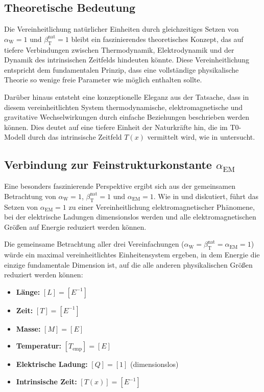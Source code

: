 \documentclass[12pt,a4paper]{article}
\newcommand{\Tfield}{T(x)}
\newcommand{\betaT}{\beta_{\text{T}}}
\newcommand{\alphaEM}{\alpha_{\text{EM}}}
\newcommand{\alphaW}{\alpha_{\text{W}}}
\begin{document}
	\subsection{Theoretische Bedeutung}
	\label{subsec:theoretical_significance}
	
	Die Vereinheitlichung natürlicher Einheiten durch gleichzeitiges Setzen von \(\alphaW = 1\) und \(\betaT^{\text{nat}} = 1\) bleibt ein faszinierendes theoretisches Konzept, das auf tiefere Verbindungen zwischen Thermodynamik, Elektrodynamik und der Dynamik des intrinsischen Zeitfelds hindeuten könnte. Diese Vereinheitlichung entspricht dem fundamentalen Prinzip, dass eine vollständige physikalische Theorie so wenige freie Parameter wie möglich enthalten sollte.
	
	Darüber hinaus entsteht eine konzeptionelle Eleganz aus der Tatsache, dass in diesem vereinheitlichten System thermodynamische, elektromagnetische und gravitative Wechselwirkungen durch einfache Beziehungen beschrieben werden können. Dies deutet auf eine tiefere Einheit der Naturkräfte hin, die im T0-Modell durch das intrinsische Zeitfeld \(\Tfield\) vermittelt wird, wie in \cite{pascher_grundkraefte_2025} untersucht.
	
	\subsection{Verbindung zur Feinstrukturkonstante \(\alphaEM\)}
	\label{subsec:connection_alpha_em}
	
	Eine besonders faszinierende Perspektive ergibt sich aus der gemeinsamen Betrachtung von \(\alphaW = 1\), \(\betaT^{\text{nat}} = 1\) und \(\alphaEM = 1\). Wie in \cite{pascher_alpha_2025} und \cite{pascher_alphabeta_2025} diskutiert, führt das Setzen von \(\alphaEM = 1\) zu einer Vereinheitlichung elektromagnetischer Phänomene, bei der elektrische Ladungen dimensionslos werden und alle elektromagnetischen Größen auf Energie reduziert werden können.
	
	Die gemeinsame Betrachtung aller drei Vereinfachungen (\(\alphaW = \betaT^{\text{nat}} = \alphaEM = 1\)) würde ein maximal vereinheitlichtes Einheitensystem ergeben, in dem Energie die einzige fundamentale Dimension ist, auf die alle anderen physikalischen Größen reduziert werden können:
	
	\begin{tcolorbox}[colback=blue!5!white,colframe=blue!75!black,title=Vollständig vereinheitlichtes Einheitensystem]
		\begin{itemize}
			\item \textbf{Länge:} \([L] = [E^{-1}]\)
			\item \textbf{Zeit:} \([T] = [E^{-1}]\)
			\item \textbf{Masse:} \([M] = [E]\)
			\item \textbf{Temperatur:} \([T_{\text{emp}}] = [E]\)
			\item \textbf{Elektrische Ladung:} \([Q] = [1]\) (dimensionslos)
			\item \textbf{Intrinsische Zeit:} \([\Tfield] = [E^{-1}]\)
		\end{itemize}
	\end{tcolorbox}
	
\end{document}
